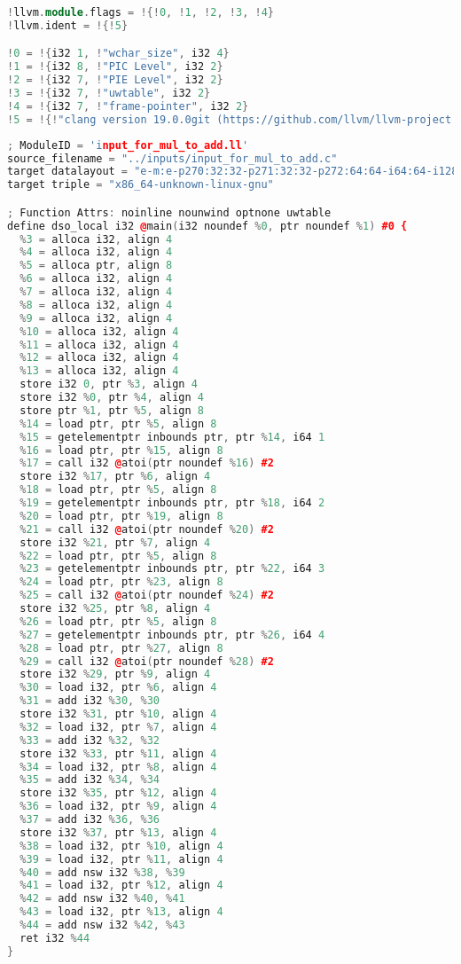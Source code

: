 \documentclass[16pt]{article}
\begin{document}
\begin{lstlisting}[caption=Initial IR File, label=input_for_mul_to_add.ll,
style=chstyle,language=C++]
!llvm.module.flags = !{!0, !1, !2, !3, !4}
!llvm.ident = !{!5}

!0 = !{i32 1, !"wchar_size", i32 4}
!1 = !{i32 8, !"PIC Level", i32 2}
!2 = !{i32 7, !"PIE Level", i32 2}
!3 = !{i32 7, !"uwtable", i32 2}
!4 = !{i32 7, !"frame-pointer", i32 2}
!5 = !{!"clang version 19.0.0git (https://github.com/llvm/llvm-project.git 790bcecce6c135476d2551805c09ed670b9f8418)"}
\end{lstlisting}

\vspace{2.5pt}
\begin{lstlisting}[caption=Optimized IR File, label=optimized_mul_to_add.ll,
style=chstyle,language=C++]
; ModuleID = 'input_for_mul_to_add.ll'
source_filename = "../inputs/input_for_mul_to_add.c"
target datalayout = "e-m:e-p270:32:32-p271:32:32-p272:64:64-i64:64-i128:128-f80:128-n8:16:32:64-S128"
target triple = "x86_64-unknown-linux-gnu"

; Function Attrs: noinline nounwind optnone uwtable
define dso_local i32 @main(i32 noundef %0, ptr noundef %1) #0 {
  %3 = alloca i32, align 4
  %4 = alloca i32, align 4
  %5 = alloca ptr, align 8
  %6 = alloca i32, align 4
  %7 = alloca i32, align 4
  %8 = alloca i32, align 4
  %9 = alloca i32, align 4
  %10 = alloca i32, align 4
  %11 = alloca i32, align 4
  %12 = alloca i32, align 4
  %13 = alloca i32, align 4
  store i32 0, ptr %3, align 4
  store i32 %0, ptr %4, align 4
  store ptr %1, ptr %5, align 8
  %14 = load ptr, ptr %5, align 8
  %15 = getelementptr inbounds ptr, ptr %14, i64 1
  %16 = load ptr, ptr %15, align 8
  %17 = call i32 @atoi(ptr noundef %16) #2
  store i32 %17, ptr %6, align 4
  %18 = load ptr, ptr %5, align 8
  %19 = getelementptr inbounds ptr, ptr %18, i64 2
  %20 = load ptr, ptr %19, align 8
  %21 = call i32 @atoi(ptr noundef %20) #2
  store i32 %21, ptr %7, align 4
  %22 = load ptr, ptr %5, align 8
  %23 = getelementptr inbounds ptr, ptr %22, i64 3
  %24 = load ptr, ptr %23, align 8
  %25 = call i32 @atoi(ptr noundef %24) #2
  store i32 %25, ptr %8, align 4
  %26 = load ptr, ptr %5, align 8
  %27 = getelementptr inbounds ptr, ptr %26, i64 4
  %28 = load ptr, ptr %27, align 8
  %29 = call i32 @atoi(ptr noundef %28) #2
  store i32 %29, ptr %9, align 4
  %30 = load i32, ptr %6, align 4
  %31 = add i32 %30, %30
  store i32 %31, ptr %10, align 4
  %32 = load i32, ptr %7, align 4
  %33 = add i32 %32, %32
  store i32 %33, ptr %11, align 4
  %34 = load i32, ptr %8, align 4
  %35 = add i32 %34, %34
  store i32 %35, ptr %12, align 4
  %36 = load i32, ptr %9, align 4
  %37 = add i32 %36, %36
  store i32 %37, ptr %13, align 4
  %38 = load i32, ptr %10, align 4
  %39 = load i32, ptr %11, align 4
  %40 = add nsw i32 %38, %39
  %41 = load i32, ptr %12, align 4
  %42 = add nsw i32 %40, %41
  %43 = load i32, ptr %13, align 4
  %44 = add nsw i32 %42, %43
  ret i32 %44
}


\end{lstlisting}
\end{document}
